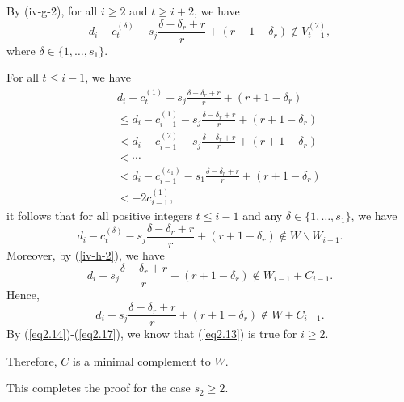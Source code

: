 \documentclass[12pt]{article}
\numberwithin{equation}{section}
\begin{document}
By (iv-g-2), for all $i\geqslant 2$ and $t\geqslant i+2$, we have
\begin{equation}\label{eq2.16}d_{i}-c_{t}^{(\delta)}-s_j\frac{\delta-\delta_r+r}{r}+(r+1-\delta_r)\notin V_{t-1}^{(2)},\end{equation}
where $\delta\in\{1,\ldots,s_1\}.$

For all $t\leqslant i-1$, we have
\begin{eqnarray*}
&&d_{i}-c_{t}^{(1)}-s_j\frac{\delta-\delta_r+r}{r}+(r+1-\delta_r)\\
&&\leq d_{i}-c_{i-1}^{(1)}-s_j\frac{\delta-\delta_r+r}{r}+(r+1-\delta_r)\\
&&< d_{i}-c_{i-1}^{(2)}-s_j\frac{\delta-\delta_r+r}{r}+(r+1-\delta_r)\\
&&< \cdots \\
&&< d_{i}-c_{i-1}^{(s_1)}-s_1\frac{\delta-\delta_r+r}{r}+(r+1-\delta_r)\\
&&<-2c_{i-1}^{(1)},
\end{eqnarray*}
it follows that for all positive integers $t\leqslant i-1$ and any $\delta\in\{1,\ldots,s_1\}$, we have $$d_{i}-c_{t}^{(\delta)}-s_j\frac{\delta-\delta_r+r}{r}+(r+1-\delta_r)\notin W\backslash W_{i-1}.$$
Moreover, by (\ref{iv-h-2}), we have $$d_{i}-s_j\frac{\delta-\delta_r+r}{r}+(r+1-\delta_r)\notin W_{i-1}+C_{i-1}.$$
Hence,
\begin{equation}\label{eq2.17}d_{i}-s_j\frac{\delta-\delta_r+r}{r}+(r+1-\delta_r)\notin W+C_{i-1}.\end{equation}
By (\ref{eq2.14})-(\ref{eq2.17}), we know that (\ref{eq2.13}) is true for $i\geqslant 2$.

Therefore, $C$ is a minimal complement to $W$.

This completes the proof for the case $s_2\geqslant 2$.
\end{document}
